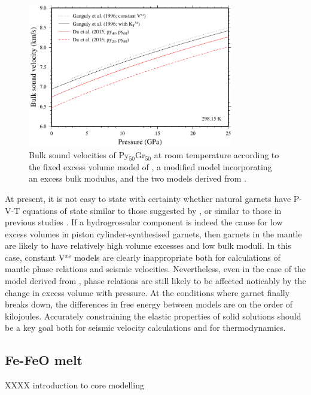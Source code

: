 \documentclass[review]{elsarticle}
\begin{document}
\begin{figure}[ht!]
  \centering
  \includegraphics[width=0.8\textwidth]{figures/pyrope_grossular_bulk_sound_velocities}
  \caption{Bulk sound velocities of Py$_{50}$Gr$_{50}$ at room temperature according to the fixed excess volume model of \citep{GCT1996}, a modified model incorporating an excess bulk modulus, and the two models derived from \cite{DCW2015}.}
  \label{fig:bulk_sound_garnet}
\end{figure}

At present, it is not easy to state with certainty whether natural garnets have P-V-T equations of state similar to those suggested by \cite{DCW2015}, or similar to those in previous studies \citep{NCK1977, BG1997, GCT1996}. If a hydrogrossular component is indeed the cause for low excess volumes in piston cylinder-synthesised garnets, then garnets in the mantle are likely to have relatively high volume excesses and low bulk moduli. In this case, constant V$^{xs}$ models are clearly inappropriate both for calculations of mantle phase relations and seismic velocities. Nevertheless, even in the case of the model derived from \cite{GCT1996}, phase relations are still likely to be affected noticably by the change in excess volume with pressure. At the conditions where garnet finally breaks down, the differences in free energy between models are on the order of kilojoules. Accurately constraining the elastic properties of solid solutions should be a key goal both for seismic velocity calculations and for thermodynamics.

\clearpage
\subsection{Fe-FeO melt}
XXXX introduction to core modelling
\end{document}
